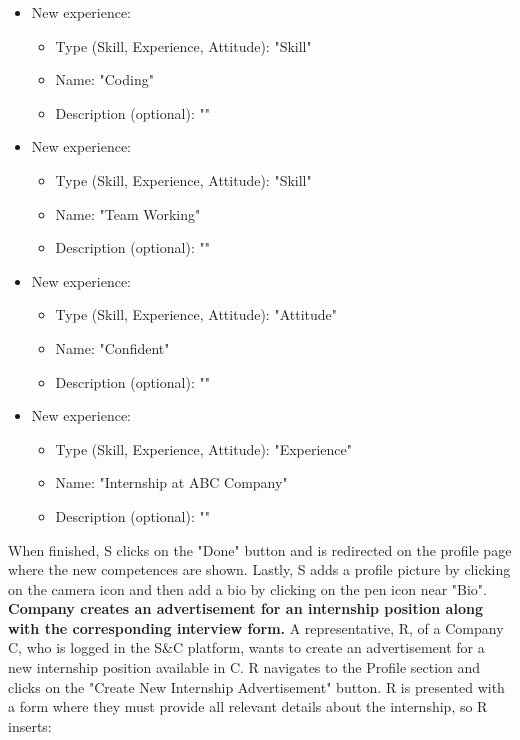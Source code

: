\begin{itemize}
    \item New experience:
    \begin{itemize}
        \item Type (Skill, Experience, Attitude): "Skill"
        \item Name: "Coding"
        \item Description (optional): ""
    \end{itemize}
    \item New experience:
    \begin{itemize}
        \item Type (Skill, Experience, Attitude): "Skill"
        \item Name: "Team Working"
        \item Description (optional): ""
    \end{itemize}
    \item New experience:
    \begin{itemize}
        \item Type (Skill, Experience, Attitude): "Attitude"
        \item Name: "Confident"
        \item Description (optional): ""
    \end{itemize}
    \item New experience:
    \begin{itemize}
        \item Type (Skill, Experience, Attitude): "Experience"
        \item Name: "Internship at ABC Company"
        \item Description (optional): ""
    \end{itemize}
\end{itemize}
When finished, S clicks on the "Done" button and is redirected on the profile page where the new competences are shown.
Lastly, S adds a profile picture by clicking on the camera icon and then add a bio by clicking on the pen icon near "Bio".
\newline\newline
\textbf{Company creates an advertisement for an internship position along with the corresponding interview form.}\newline
A representative, R, of a Company C, who is logged in the S\&C platform, wants to create an advertisement for a new internship position available in C. R navigates to the Profile section and clicks on the "Create New Internship Advertisement" button. R is presented with a form where they must provide all relevant details about the internship, so R inserts:
